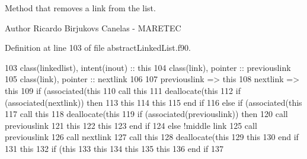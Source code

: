 Method that removes a link from the list. 

\begin{DoxyAuthor}{Author}
Ricardo Birjukovs Canelas -\/ M\+A\+R\+E\+T\+EC 
\end{DoxyAuthor}


Definition at line 103 of file abstract\+Linked\+List.\+f90.


\begin{DoxyCode}
103     \textcolor{keywordtype}{class}(linkedlist), \textcolor{keywordtype}{intent(inout)} :: this    
104     \textcolor{keywordtype}{class}(link), \textcolor{keywordtype}{pointer} :: previouslink
105     \textcolor{keywordtype}{class}(link), \textcolor{keywordtype}{pointer} :: nextlink 
106     
107     previouslink => this%
108     nextlink => this%
109     \textcolor{keywordflow}{if} (\textcolor{keyword}{associated}(this%
110         \textcolor{keyword}{call }this%
111         \textcolor{keyword}{deallocate}(this%
112         \textcolor{keywordflow}{if} (\textcolor{keyword}{associated}(nextlink)) \textcolor{keywordflow}{then}
113             this%
114             this%
115 \textcolor{keywordflow}{        end if}
116     \textcolor{keywordflow}{else} \textcolor{keywordflow}{if} (\textcolor{keyword}{associated}(this%
117         \textcolor{keyword}{call }this%
118         \textcolor{keyword}{deallocate}(this%
119         \textcolor{keywordflow}{if} (\textcolor{keyword}{associated}(previouslink)) \textcolor{keywordflow}{then}
120             \textcolor{keyword}{call }previouslink%
121             this%
122             this%
123 \textcolor{keywordflow}{        end if}
124     \textcolor{keywordflow}{else} \textcolor{comment}{!middle link}
125         \textcolor{keyword}{call }previouslink%
126         \textcolor{keyword}{call }nextlink%
127         \textcolor{keyword}{call }this%
128         \textcolor{keyword}{deallocate}(this%
129         this%
130 \textcolor{keywordflow}{    end if}
131     this%
132     \textcolor{keywordflow}{if} (this%
133         this%
134         this%
135         this%
136 \textcolor{keywordflow}{    end if}
137     
\end{DoxyCode}
\mbox{\label{namespaceabstract__linkedlist__mod_a46ff8b8a3ab81610eb47d72d742778c3}} 
